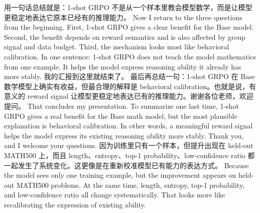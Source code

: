 {}用一句话总结就是：1-shot GRPO 不是从一个样本里教会模型数学，而是让模型更稳定地表达它原本已经有的推理能力。\markdownRendererInterblockSeparator
{}\markdownRendererInterblockSeparator
{}Now I return to the three questions from the beginning. First, 1-shot GRPO gives a clear benefit for the Base model. Second, the benefit depends on reward semantics and is also affected by group signal and data budget. Third, the mechanism looks most like behavioral calibration.\markdownRendererInterblockSeparator
{}In one sentence: 1-shot GRPO does not teach the model mathematics from one example. It helps the model express reasoning ability it already has more stably.\markdownRendererInterblockSeparator
{}\markdownRendererHorizontalRule{}\markdownRendererInterblockSeparator
{}\markdownRendererInterblockSeparator
{}\markdownRendererInterblockSeparator
{}我的汇报到这里就结束了。\markdownRendererInterblockSeparator
{}最后再总结一句：1-shot GRPO 在 Base 数学模型上确实有收益，但最合理的解释是 behavioral calibration。也就是说，有意义的 reward signal 让模型更稳定地表达已有的推理能力。谢谢各位老师，欢迎提问。\markdownRendererInterblockSeparator
{}\markdownRendererInterblockSeparator
{}That concludes my presentation.\markdownRendererInterblockSeparator
{}To summarize one last time, 1-shot GRPO gives a real benefit for the Base math model, but the most plausible explanation is behavioral calibration. In other words, a meaningful reward signal helps the model express its existing reasoning ability more stably. Thank you, and I welcome your questions.\markdownRendererInterblockSeparator
{}\markdownRendererHorizontalRule{}\markdownRendererInterblockSeparator
{}\markdownRendererInterblockSeparator
{}\markdownRendererInterblockSeparator
{}\markdownRendererInterblockSeparator
{}因为训练里只有一个样本，但提升出现在 held-out MATH500 上，而且 length、entropy、top-1 probability、low-confidence ratio 都一起发生了系统变化。这更像是在重新校准模型已有能力的表达方式。\markdownRendererInterblockSeparator
{}\markdownRendererInterblockSeparator
{}Because the model sees only one training example, but the improvement appears on held-out MATH500 problems. At the same time, length, entropy, top-1 probability, and low-confidence ratio all change systematically. That looks more like recalibrating the expression of existing ability.\markdownRendererInterblockSeparator
